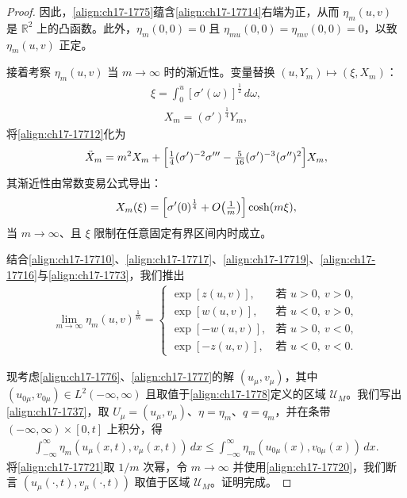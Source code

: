 \documentclass[../../main.tex]{subfiles}
\begin{document}
\begin{proof}
因此，\eqref{align:ch17-1775}蕴含\eqref{align:ch17-17714}右端为正，从而 $\eta_m(u,v)$ 是 $\mathbb{R}^2$ 上的凸函数。此外，$\eta_m(0,0)=0$ 且 $\eta_{mu}(0,0)=\eta_{mv}(0,0)=0$，以致 $\eta_m(u,v)$ 正定。

接着考察 $\eta_m(u,v)$ 当 $m\to\infty$ 时的渐近性。变量替换 $(u,Y_m)\mapsto(\xi,X_m)$：
\begin{align}
\xi=\int_0^u[\sigma'(\omega)]^{\frac{1}{2}}\,d\omega,
\label{align:ch17-17716}
\end{align}
\begin{align}
X_m=(\sigma')^{\frac{1}{4}}Y_m,
\label{align:ch17-17717}
\end{align}
将\eqref{align:ch17-17712}化为
\begin{align}
\ddot X_m=m^2X_m+\Bigl[\tfrac{1}{4}(\sigma')^{-2}\sigma'''-\tfrac{5}{16}(\sigma')^{-3}(\sigma'')^2\Bigr]X_m,
\label{align:ch17-17718}
\end{align}
其渐近性由常数变易公式导出：
\begin{align}
X_m(\xi)=\Bigl[\sigma'(0)^{\frac{1}{4}}+O\bigl(\tfrac{1}{m}\bigr)\Bigr]\cosh(m\xi),
\label{align:ch17-17719}
\end{align}
当 $m\to\infty$、且 $\xi$ 限制在任意固定有界区间内时成立。

结合\eqref{align:ch17-17710}、\eqref{align:ch17-17717}、\eqref{align:ch17-17719}、\eqref{align:ch17-17716}与\eqref{align:ch17-1773}，我们推出
\begin{align}
\lim_{m\to\infty}\eta_m(u,v)^{\frac{1}{m}}=
\begin{cases}
\exp[z(u,v)],&\text{若 }u>0,\ v>0,\\
\exp[w(u,v)],&\text{若 }u<0,\ v>0,\\
\exp[-w(u,v)],&\text{若 }u>0,\ v<0,\\
\exp[-z(u,v)],&\text{若 }u<0,\ v<0.
\end{cases}
\label{align:ch17-17720}
\end{align}

现考虑\eqref{align:ch17-1776}、\eqref{align:ch17-1777}的解 $(u_\mu,v_\mu)$，其中 $(u_{0\mu},v_{0\mu})\in L^2(-\infty,\infty)$ 且取值于\eqref{align:ch17-1778}定义的区域 $\mathscr{U}_M$。我们写出\eqref{align:ch17-1737}，取 $U_\mu=(u_\mu,v_\mu)$、$\eta=\eta_m$、$q=q_m$，并在条带 $(-\infty,\infty)\times[0,t]$ 上积分，得
\begin{align}
\int_{-\infty}^\infty\eta_m(u_\mu(x,t),v_\mu(x,t))\,dx\leqslant\int_{-\infty}^\infty\eta_m(u_{0\mu}(x),v_{0\mu}(x))\,dx.
\label{align:ch17-17721}
\end{align}
将\eqref{align:ch17-17721}取 $1/m$ 次幂，令 $m\to\infty$ 并使用\eqref{align:ch17-17720}，我们断言 $(u_\mu(\cdot,t),v_\mu(\cdot,t))$ 取值于区域 $\mathscr{U}_M$。证明完成。
\end{proof}
\end{document}
